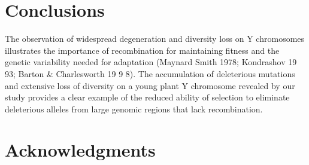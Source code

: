 \documentclass[9pt,twocolumn,twoside]{gsajnl}
\begin{document}



\section*{Conclusions}

The observation of widespread degeneration and diversity loss on Y chromosomes illustrates the importance of recombination for maintaining fitness and the genetic variability needed for adaptation (Maynard Smith 1978; Kondrashov 19 93; Barton & Charlesworth 19 9 8). The accumulation of deleterious mutations and extensive loss of diversity on a young plant Y chromosome revealed by our study provides a clear example of the reduced ability of selection to eliminate deleterious alleles from large genomic regions that lack recombination.

\section*{Acknowledgments}



\end{document}
